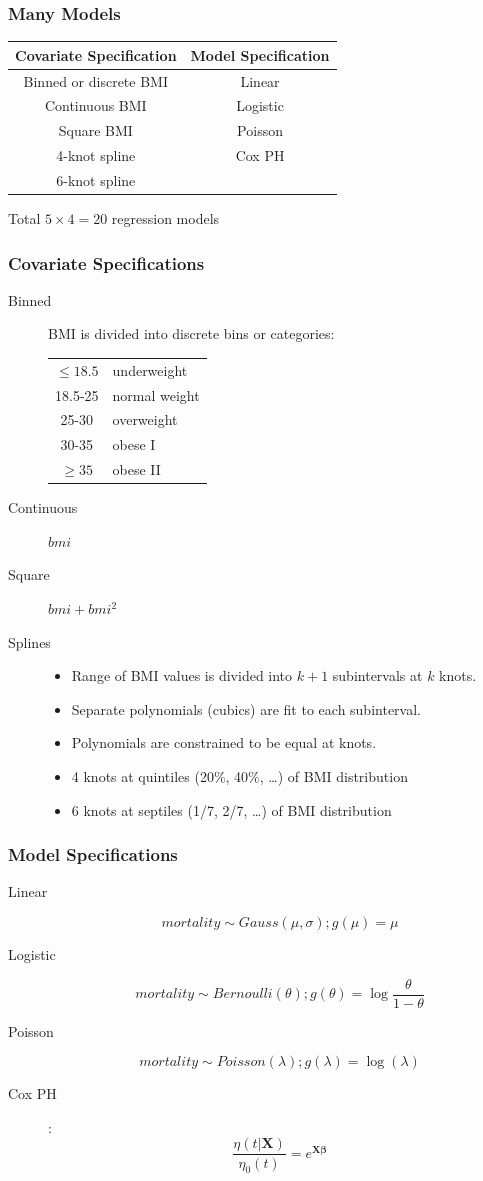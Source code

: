 \documentclass{philslides}
\begin{document}
\frame
{
	\frametitle{Many Models}
	\begin{center}
	\begin{tabular}{c|c}
	\textbf{Covariate Specification} & \textbf{Model Specification}\\
	\hline
	Binned or discrete BMI & Linear \\
	Continuous BMI & Logistic\\
	Square BMI & Poisson\\
	4-knot spline & Cox PH\\
	6-knot spline &\\
	\end{tabular}
	\end{center}
	Total $5 \times 4 = 20$ regression models
}
\frame
{
	\frametitle{Covariate Specifications}
	\begin{description}
	\item[Binned] BMI is divided into discrete bins or categories:  
		\begin{center}
		\small
		\begin{tabular}{cl}
		$\leq 18.5$ & underweight\\
		18.5-25 & normal weight\\
		25-30 & overweight\\
		30-35 & obese I\\
		$\geq 35$ & obese II
		\end{tabular}
		\end{center}
	\item[Continuous] $bmi$
	\item[Square] $bmi + bmi^2$
	\item[Splines] 
		\begin{itemize}
		\scriptsize
		\item Range of BMI values is divided into $k+1$ subintervals at $k$ knots.  
		\item Separate polynomials (cubics) are fit to each subinterval.  
		\item Polynomials are constrained to be equal at knots.  
		\item 4 knots at quintiles (20\%, 40\%, \ldots) of BMI distribution
		\item 6 knots at septiles (1/7, 2/7, \ldots) of BMI distribution
		\end{itemize}
	\end{description}
}
\frame
{
	\frametitle{Model Specifications}
	\begin{description}
	\item[Linear] 
		\[mortality \sim Gauss(\mu, \sigma); g(\mu) = \mu\]
	\item[Logistic] 
		\[mortality \sim Bernoulli(\theta); g(\theta) = \log \frac{\theta}{1-\theta}\]
	\item[Poisson] 
		\[mortality \sim Poisson(\lambda); g(\lambda) = \log(\lambda)\]
	\item[Cox PH] : 
		\[\frac{\eta(t | \mathbf{X})}{\eta_0(t)} = e^{\mathbf{X\beta}} \]
	\end{description}
}
\end{document}
